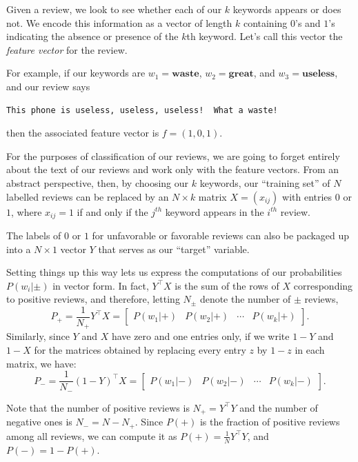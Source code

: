 \documentclass[
  11pt,
  letterpaper,
]{scrbook}
\theoremstyle{plain}
\theoremstyle{plain}
\theoremstyle{remark}
\begin{document}
Given a review, we look to see whether each of our \(k\) keywords
appears or does not. We encode this information as a vector of length
\(k\) containing \(0\)'s and \(1\)'s indicating the absence or presence
of the \(k\)th keyword. Let's call this vector the \emph{feature vector}
for the review.

For example, if our keywords are \(w_1=\mathbf{waste}\),
\(w_2=\mathbf{great}\), and \(w_3=\mathbf{useless}\), and our review
says

\begin{verbatim}
This phone is useless, useless, useless!  What a waste!
\end{verbatim}

then the associated feature vector is \(f=(1,0,1)\).

For the purposes of classification of our reviews, we are going to
forget entirely about the text of our reviews and work only with the
feature vectors. From an abstract perspective, then, by choosing our
\(k\) keywords, our ``training set'' of \(N\) labelled reviews can be
replaced by an \(N\times k\) matrix \(X=(x_{ij})\) with entries \(0\) or
\(1\), where \(x_{ij}=1\) if and only if the \(j^{th}\) keyword appears
in the \(i^{th}\) review.

The labels of \(0\) or \(1\) for unfavorable or favorable reviews can
also be packaged up into a \(N\times 1\) vector \(Y\) that serves as our
``target'' variable.

Setting things up this way lets us express the computations of our
probabilities \(P(w_{i}|\pm)\) in vector form. In fact,
\(Y^{\intercal}X\) is the sum of the rows of \(X\) corresponding to
positive reviews, and therefore, letting \(N_{\pm}\) denote the number
of \(\pm\) reviews, \[
P_{+} = \frac{1}{N_{+}}Y^{\intercal}X = \left[\begin{array}{cccc} P(w_{1}|+)& P(w_{2}|+) & \cdots &P(w_{k}|+)\end{array}\right].
\] Similarly, since \(Y\) and \(X\) have zero and one entries only, if
we write \(1-Y\) and \(1-X\) for the matrices obtained by replacing
every entry \(z\) by \(1-z\) in each matrix, we have: \[
P_{-} = \frac{1}{N_{-}}(1-Y)^{\intercal}X =  \left[\begin{array}{cccc} P(w_{1}|-)& P(w_{2}|-) & \cdots &P(w_{k}|-)\end{array}\right].
\]

Note that the number of positive reviews is \(N_{+}=Y^{\intercal}Y\) and
the number of negative ones is \(N_{-}=N-N_{+}\). Since \(P(+)\) is the
fraction of positive reviews among all reviews, we can compute it as
\(P(+)=\frac{1}{N}Y^{\intercal}Y\), and \(P(-)=1-P(+)\).
\end{document}
